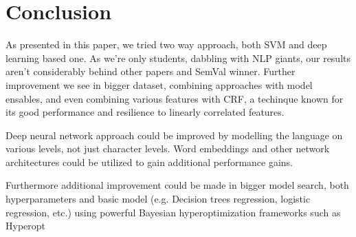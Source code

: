 \documentclass[10pt, a4paper]{article}
\begin{document}
\section{Conclusion}

As presented in this paper, we tried two way approach, both SVM and deep learning based one. As we're only students, dabbling with NLP giants, our results aren't considerably behind other papers and SemVal winner. Further improvement we see in bigger dataset, combining approaches with model ensables, and even combining various features with CRF, a techinque known for its good performance and resilience to linearly correlated features.

Deep neural network approach could be improved by modelling the language on various levels, not just character levels. 
Word embeddings and other network architectures could be utilized to gain additional performance gains.

Furthermore additional improvement could be made in bigger model search, both hyperparameters and basic model (e.g. Decision trees regression, logistic regression, etc.) using powerful Bayesian hyperoptimization frameworks such as Hyperopt~\citep{bergstra2013hyperopt}



\nocite{*}
\end{document}
